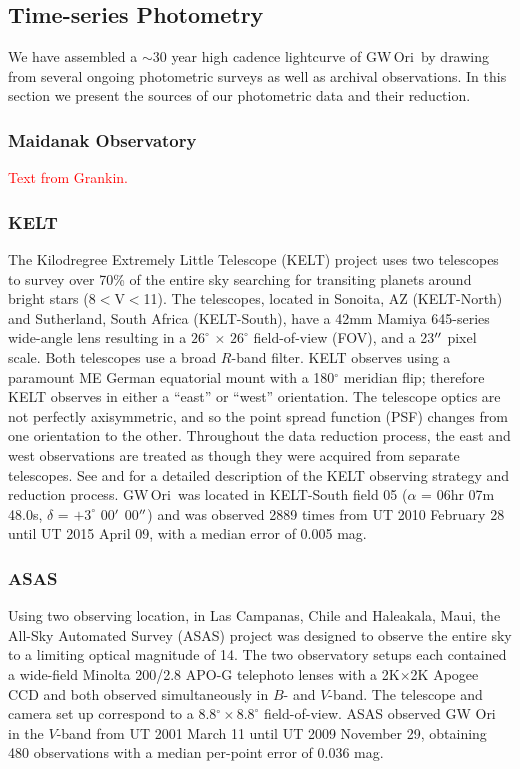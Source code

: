 \documentclass[twocolumn]{aastex61}
\newcommand{\todo}[1]{ \textcolor{red}{#1}}
\newcommand{\obj}{GW\,Ori}
\begin{document}
\subsection{Time-series Photometry}
We have assembled a $\sim$30 year high cadence lightcurve of \obj\ by drawing from several ongoing photometric surveys as well as archival observations. In this section we present the sources of our photometric data and their reduction.

\subsubsection{Maidanak Observatory}
\todo{Text from Grankin.}

\subsubsection{KELT}
The Kilodregree Extremely Little Telescope (KELT) project uses two telescopes to survey over 70\% of the entire sky searching for transiting planets around bright stars (8$<$V$<$11). The telescopes, located in Sonoita, AZ (KELT-North) and Sutherland, South Africa (KELT-South), have a 42mm Mamiya 645-series wide-angle lens resulting in a $26^{\circ}$ $\times$ $26^{\circ}$ field-of-view (FOV), and a 23$\mbox{$^{\prime\prime}$}$ pixel scale. Both telescopes use a broad $R$-band filter. KELT observes using a paramount ME German equatorial mount with a 180$^{\circ}$ meridian flip; therefore KELT observes in either a ``east'' or ``west'' orientation. The telescope optics are not perfectly axisymmetric, and so the point spread function (PSF) changes from one orientation to the other. Throughout the data reduction process, the east and west observations are treated as though they were acquired from separate telescopes. See \citet{Siverd12} and \citet{Kuhn16} for a detailed description of the KELT observing strategy and reduction process. \obj\ was located in KELT-South field 05 ($\alpha$ =  06hr 07m 48.0s, $\delta$ = $+3^{\circ}$ 00$\mbox{$^\prime$}$ 00$\mbox{$^{\prime\prime}$}$) and was observed 2889 times from UT 2010 February 28 until UT 2015 April 09, with a median error of 0.005 mag.

\subsubsection{ASAS}
Using two observing location, in Las Campanas, Chile and Haleakala, Maui, the All-Sky Automated Survey (ASAS) project was designed to observe the entire sky to a limiting optical magnitude of 14. The two observatory setups each contained a wide-field Minolta 200/2.8 APO-G telephoto lenses with a 2K$\times$2K Apogee CCD and both observed simultaneously in $B$- and $V$-band. The telescope and camera set up correspond to a 8.8$^{\circ}\times8.8^{\circ}$ field-of-view. ASAS observed GW Ori in the $V$-band from UT 2001 March 11 until UT 2009 November 29, obtaining 480 observations with a median per-point error of 0.036 mag.
\end{document}
